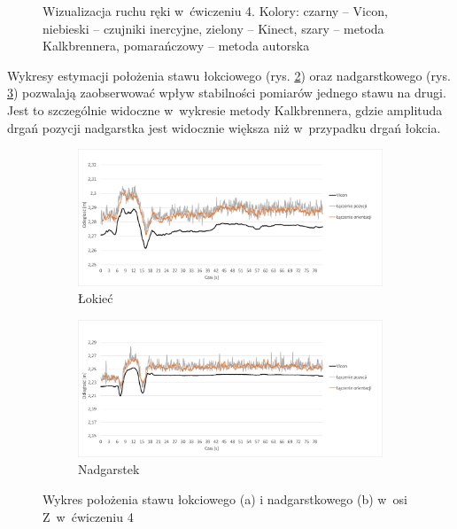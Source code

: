 \begin{savenotes}
\begin{figure}[hbp]
		\caption[Wizualizacja ruchu ręki w~ćwiczeniu 4]{Wizualizacja ruchu ręki w~ćwiczeniu 4.  Kolory: czarny -- Vicon, niebieski -- czujniki inercyjne, zielony -- Kinect, szary -- metoda Kalkbrennera, pomarańczowy -- metoda autorska}	
		\label{fig:experiments:four}
	\end{figure}
\end{savenotes}
																						
Wykresy estymacji położenia stawu łokciowego (rys. \ref{fig:experiments:four:elbowZ}) oraz nadgarstkowego (rys. \ref{fig:experiments:four:wristZ}) pozwalają zaobserwować wpływ stabilności pomiarów jednego stawu na drugi. Jest to szczególnie widoczne w~wykresie metody Kalkbrennera, gdzie amplituda drgań pozycji nadgarstka jest widocznie większa niż w~przypadku drgań łokcia. 
																						
\begin{savenotes}
	\begin{figure}[hbp]
		\centering
		\begin{subfigure}[b]{0.65\textwidth}
			\centering
			\includegraphics[width=\linewidth]{images/400/3.png}		
			\caption{Łokieć}
			\label{fig:experiments:four:elbowZ}
		\end{subfigure}
		\begin{subfigure}[b]{0.65\textwidth}
			\centering
			\includegraphics[width=\linewidth]{images/400/6.png}		
			\caption{Nadgarstek}
			\label{fig:experiments:four:wristZ}
		\end{subfigure}
		\caption[Wykres położenia stawu łokciowego i nadgarstkowego w~osi Z~w~ćwiczeniu 4]{Wykres położenia stawu łokciowego (a) i nadgarstkowego (b) w~osi Z~w~ćwiczeniu 4}	
		\label{fig:experiments:four:Zaxis}
	\end{figure}
\end{savenotes}
																								
